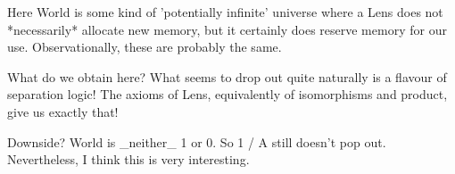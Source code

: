 Here World is some kind of 'potentially infinite' universe where a Lens does not
*necessarily* allocate new memory, but it certainly does reserve memory for our use.
Observationally, these are probably the same.

What do we obtain here? What seems to drop out quite naturally is a flavour of
separation logic!  The axioms of Lens, equivalently of isomorphisms and product, give
us exactly that!

Downside? World is _neither_ 1 or 0.  So 1 / A still doesn't pop out.
Nevertheless, I think this is very interesting.
